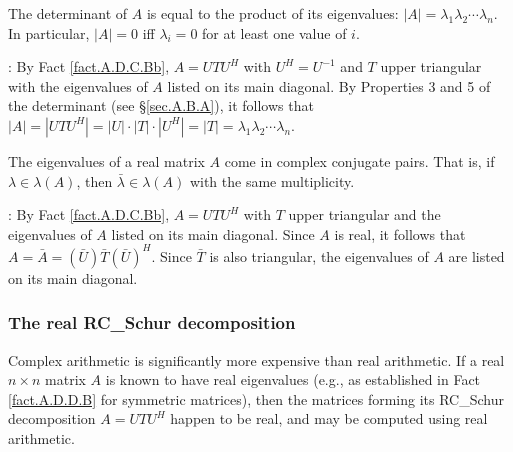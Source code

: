 \begin{fact} \label{fact.A.D.C.Be} The determinant of $A$ is equal to the product of its eigenvalues:
$|A|=\lambda_{1}\lambda_{2}\cdots\lambda_{n}$.  In particular, $|A|=0$
iff $\lambda_{i}=0$ for at least one value of $i$.
\end{fact}

\/: By Fact \ref{fact.A.D.C.Bb}, $A=UTU^{H}$ with
$U^{H}=U^{-1}$ and $T$ upper triangular with the eigenvalues of $A$
listed on its main diagonal.  By Properties 3 and 5 of the determinant
(see \S \ref{sec.A.B.A}), it follows that $|A|=|UTU^{H}|=|U|\cdot
|T|\cdot |U^{H}|= |T| =
\lambda_{1}\lambda_{2}\cdots\lambda_{n}$.  \endproof \vskip0.1in

\begin{fact} \label{fact.A.D.C.Bf} The eigenvalues of a real matrix $A$ come in complex conjugate pairs.
That is, if $\lambda\in \lambda(A)$, then $\bar\lambda \in \lambda(A)$ with the same multiplicity.
\end{fact}

\/: By Fact \ref{fact.A.D.C.Bb}, $A=UTU^{H}$ with $T$ upper triangular and the eigenvalues of $A$
listed on its main diagonal.  Since $A$ is real, it follows that $A=\bar A=(\bar U) \bar T (\bar U)^{H}$.  Since $\bar T$ is also triangular,
the eigenvalues of $A$ are listed on its main diagonal.  \endproof

\subsubsection{The real RC_Schur decomposition} \label{sec.A.D.Ca}

Complex arithmetic is significantly more expensive than real arithmetic.  If a real $n\times n$ matrix $A$ is known
to have real eigenvalues (e.g., as established in Fact \ref{fact.A.D.D.B} for symmetric matrices), then the matrices forming its
RC_Schur decomposition $A=UTU^H$ happen to be real, and may be computed using real arithmetic.  

